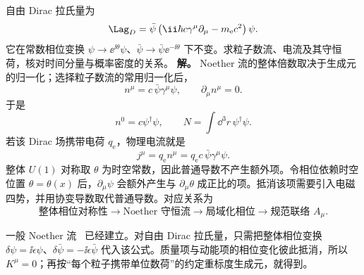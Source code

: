\begin{exbox}
自由 Dirac 拉氏量为
\begin{equation*}
 \Lag_D
 =\bar\psi\left(\ii\hbar c\gamma^\mu\partial_\mu-m_{\mathrm e} c^2\right)\psi.
\end{equation*}
它在常数相位变换 $\psi\to \ee^{\ii\theta}\psi$、$\bar\psi\to\bar\psi \ee^{-\ii\theta}$ 下不变。求粒子数流、电流及其守恒荷，核对时间分量与概率密度的关系。
\textbf{解。} Noether 流的整体倍数取决于生成元的归一化；选择粒子数流的常用归一化后，
\begin{equation}
 {n^\mu=c\,\bar\psi\gamma^\mu\psi,
 \qquad \partial_\mu n^\mu=0.}
 \label{eq:dirac-number-current-dp61}
\end{equation}
于是
\begin{equation*}
 n^0=c\psi^\dagger\psi,
 \qquad
 N=\int\dd^3 r\,\psi^\dagger\psi.
\end{equation*}
若该 Dirac 场携带电荷 $q_{\mathrm e}$，物理电流就是
\begin{equation}
 {j^\mu=q_{\mathrm e} n^\mu=q_{\mathrm e} c\,\bar\psi\gamma^\mu\psi.}
 \label{eq:dirac-electric-current-from-noether-dp61}
\end{equation}
整体 $U(1)$ 对称取 $\theta$ 为时空常数，因此普通导数不产生额外项。令相位依赖时空位置 $\theta=\theta(x)$ 后，$\partial_\mu\psi$ 会额外产生与 $\partial_\mu\theta$ 成正比的项。抵消该项需要引入电磁四势，并用协变导数取代普通导数。对应关系为
\[
 \text{整体相位对称性}
 \longrightarrow \text{Noether 守恒流}
 \longrightarrow \text{局域化相位}
 \longrightarrow \text{规范联络 }A_\mu.
\]

\medskip

一般 Noether 流~ 已经建立。对自由 Dirac 拉氏量，只需把整体相位变换 $\delta\psi=\ii\epsilon\psi$、$\delta\bar\psi=-\ii\epsilon\bar\psi$ 代入该公式。质量项与动能项的相位变化彼此抵消，所以 $K^\mu=0$；再按“每个粒子携带单位数荷”的约定重标度生成元，就得到。


\end{exbox}
